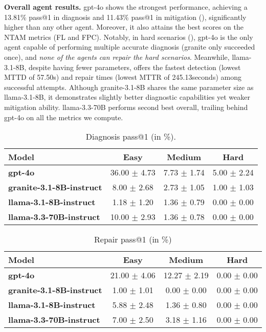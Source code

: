 \textbf{Overall agent results.}
gpt-4o shows the strongest performance, achieving a 13.81\% pass@1 in diagnosis and 11.43\% pass@1 in mitigation (), significantly higher than any other agent. Moreover, it also attains the best scores on the NTAM metrics (FL and FPC). 
Notably, in hard scenarios (), gpt-4o is the only agent capable of performing multiple accurate diagnosis (granite only succeeded once), and \textit{none of the agents can repair the hard scenarios}.
Meanwhile, llama-3.1-8B, despite having fewer parameters, offers the fastest detection (lowest MTTD of 57.50s) and repair times (lowest MTTR of 245.13seconds) among successful attempts. 
Although granite-3.1-8B shares the same parameter size as llama-3.1-8B, it demonstrates slightly better diagnostic capabilities yet weaker mitigation ability. 
llama-3.3-70B performs second best overall, trailing behind gpt-4o on all the metrics we compute. 






\begin{table*}[!ht]
\small
\centering
\caption{Diagnosis pass@1 (in \%).}
\label{tab:sre:diag_pass1}
\begin{tabular}{lccc}
\toprule
\textbf{Model} & \textbf{Easy} & \textbf{Medium} & \textbf{Hard} \\
\midrule
\textbf{gpt-4o}                             & 36.00 $\pm$ 4.73 & 7.73 $\pm$ 1.74 & 5.00 $\pm$ 2.24 \\
\textbf{granite-3.1-8B-instruct}    & 8.00 $\pm$ 2.68  & 2.73 $\pm$ 1.05 & 1.00 $\pm$ 1.03 \\
\textbf{llama-3.1-8B-instruct}      & 1.18 $\pm$ 1.20  & 1.36 $\pm$ 0.79 & 0.00 $\pm$ 0.00 \\
\textbf{llama-3.3-70B-instruct}      & 10.00 $\pm$ 2.93 & 1.36 $\pm$ 0.78 & 0.00 $\pm$ 0.00 \\
\bottomrule
\end{tabular}

\end{table*}

\begin{table*}[!ht]
\small
\centering
\caption{Repair pass@1 (in \%)}
\label{tab:sre:repair_pass1}
\begin{tabular}{lccc}
\toprule
\textbf{Model} & \textbf{Easy} & \textbf{Medium} & \textbf{Hard} \\
\midrule
\textbf{gpt-4o}                             & 21.00 $\pm$ 4.06 & 12.27 $\pm$ 2.19 & 0.00 $\pm$ 0.00 \\
\textbf{granite-3.1-8B-instruct}     & 1.00 $\pm$ 1.01  & 0.00 $\pm$ 0.00  & 0.00 $\pm$ 0.00 \\
\textbf{llama-3.1-8B-instruct}       & 5.88 $\pm$ 2.48  & 1.36 $\pm$ 0.80  & 0.00 $\pm$ 0.00 \\
\textbf{llama-3.3-70B-instruct}      & 7.00 $\pm$ 2.50  & 3.18 $\pm$ 1.16  & 0.00 $\pm$ 0.00 \\
\bottomrule
\end{tabular}

\end{table*}



